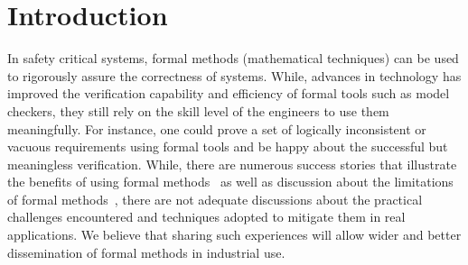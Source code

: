 \section{Introduction}
\label{sec:intro}

 
In safety critical systems, formal methods (mathematical techniques) can be used to rigorously assure the correctness of systems. %
While, advances in technology has improved the verification capability and efficiency of formal tools such as model checkers, they still rely on the skill level of the engineers to use them meaningfully. For instance, one could prove a set of logically inconsistent or vacuous requirements using formal tools and be happy about the successful but meaningless verification. While, there are numerous success stories that illustrate the benefits of using formal methods~\cite{Miller03:shalls,Whalen07:FMICS} as well as discussion about the limitations of formal methods~\cite{kneuper1997limits,hall1990seven}, there are not adequate discussions about the practical challenges encountered and techniques adopted to mitigate them in real applications. We believe that sharing such experiences will allow wider and better dissemination of formal methods in industrial use.

